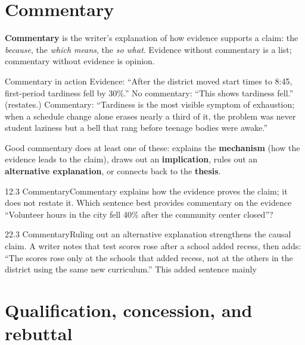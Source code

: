 \documentclass[11pt]{article}
\begin{document}
\section{Commentary}

\textbf{Commentary} is the writer's explanation of how evidence supports a claim: the \emph{because}, the \emph{which means}, the \emph{so what}. Evidence without commentary is a list; commentary without evidence is opinion.

\begin{study}{Commentary in action}
Evidence: ``After the district moved start times to 8:45, first-period tardiness fell by 30\%.''
No commentary: ``This shows tardiness fell.'' (restates.)
Commentary: ``Tardiness is the most visible symptom of exhaustion; when a schedule change alone erases nearly a third of it, the problem was never student laziness but a bell that rang before teenage bodies were awake.''
\end{study}

Good commentary does at least one of these: explains the \textbf{mechanism} (how the evidence leads to the claim), draws out an \textbf{implication}, rules out an \textbf{alternative explanation}, or connects back to the \textbf{thesis}.

\begin{q}{1}{2.3 Commentary}{Commentary explains how the evidence proves the claim; it does not restate it.}
Which sentence best provides commentary on the evidence ``Volunteer hours in the city fell 40\% after the community center closed''?
\end{q}

\begin{q}{2}{2.3 Commentary}{Ruling out an alternative explanation strengthens the causal claim.}
A writer notes that test scores rose after a school added recess, then adds: ``The scores rose only at the schools that added recess, not at the others in the district using the same new curriculum.'' This added sentence mainly
\end{q}

\section{Qualification, concession, and rebuttal}
\end{document}
